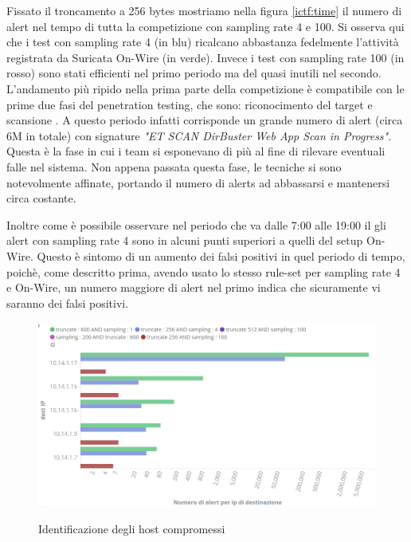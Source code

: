 \documentclass[12pt,a4paper,openright,twoside]{report}
\begin{document}
Fissato il troncamento a 256 bytes mostriamo nella figura \ref{ictf:time} il numero di alert nel tempo di tutta la
competizione con sampling rate 4 e 100. Si osserva qui che i test con sampling rate 4 (in blu)
ricalcano abbastanza fedelmente l'attivit\`a registrata da Suricata On-Wire (in verde).
Invece i test con sampling rate 100 (in rosso) sono stati efficienti nel primo periodo ma del
quasi inutili nel secondo. L'andamento pi\`u ripido nella prima parte della competizione \`e
compatibile con le prime due fasi del penetration testing, che sono: riconocimento del target
e scansione \cite{EXP16}. A questo periodo infatti corrisponde un grande numero di alert (circa 6M in totale)
con signature {\it "ET SCAN DirBuster Web App Scan in Progress"}. Questa \`e la fase in cui
i team si esponevano di pi\`u al fine di rilevare eventuali falle nel sistema. Non appena passata
questa fase, le tecniche si sono notevolmente affinate, portando il numero di alerts ad abbassarsi e mantenersi circa costante.

Inoltre come \`e possibile osservare nel periodo che va dalle 7:00 alle 19:00 il gli alert
con sampling rate 4 sono in alcuni punti superiori a quelli del setup On-Wire. Questo
\`e sintomo di un aumento dei falsi positivi in quel periodo di tempo, poich\`e, come descritto prima, avendo usato
lo stesso rule-set per sampling rate 4 e On-Wire, un numero maggiore di alert nel primo
indica che sicuramente vi saranno dei falsi positivi.


\begin{figure}[h!]
\begin{center}                          %
  \includegraphics[width=\textwidth]{images/ICTF-forens-dest.png}
  \caption{Identificazione degli host compromessi}\label{ictf:forens}
  \label{}
\end{center}
\end{figure}
\end{document}
